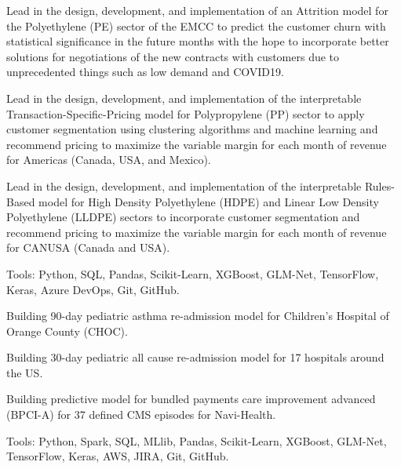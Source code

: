 \documentclass[]{template}
\begin{document}
\vspace{\topsep}

\begin{tightemize}
\item Lead in the design, development, and implementation of an Attrition model for the Polyethylene (PE) sector of the EMCC to predict the customer churn with statistical significance in the future months with the hope to incorporate better solutions for negotiations of the new contracts with customers due to unprecedented things such as low demand and COVID19.

\item  Lead in the design, development, and implementation of the interpretable Transaction-Specific-Pricing model for Polypropylene (PP) sector to apply customer segmentation using clustering algorithms and machine learning and recommend pricing to maximize the variable margin for each month of revenue for Americas (Canada, USA, and Mexico).

\item Lead in the design, development, and implementation of the interpretable Rules-Based model for High Density Polyethylene (HDPE) and Linear Low Density Polyethylene (LLDPE) sectors to incorporate customer segmentation and recommend pricing to maximize the variable margin for each month of revenue for CANUSA (Canada and USA).

\item Tools: Python, SQL, Pandas, Scikit-Learn, XGBoost, GLM-Net, TensorFlow, Keras, Azure DevOps, Git, GitHub.
\end{tightemize}
\sectionsep


\sectionsep
{}

\vspace{\topsep} %
\begin{tightemize}
\item Building 90-day pediatric asthma re-admission model for Children's Hospital of Orange County (CHOC).
\item Building 30-day pediatric all cause re-admission model for 17 hospitals around the US.
\item Building predictive model for bundled payments care improvement advanced (BPCI-A) for 37 defined CMS episodes for Navi-Health.
\item Tools: Python, Spark, SQL, MLlib, Pandas, Scikit-Learn, XGBoost, GLM-Net, TensorFlow, Keras, AWS, JIRA, Git, GitHub.
\end{tightemize}
\sectionsep
\sectionsep
\end{document}
